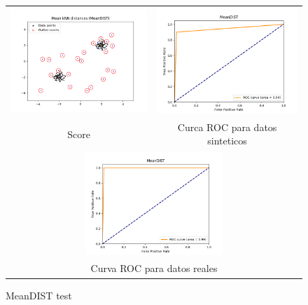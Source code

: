 \begin{figure}[H]
  \begin{tabular}{cc}
    \includegraphics[width=65mm,height=40mm]{imagenes/meandist-sintetico.png} &   \includegraphics[width=65mm,height=40mm]{imagenes/meandist-sintetic-roc.png} \\
  Score & Curca ROC para datos sinteticos \\[6pt]
  \multicolumn{2}{c}{\includegraphics[width=65mm,height=39mm]{imagenes/meandist-test.png} }\\
  \multicolumn{2}{c}{Curva ROC para datos reales}\\
  \end{tabular}
  \caption{\label{fig:meandisttest} MeanDIST test}
\end{figure}

